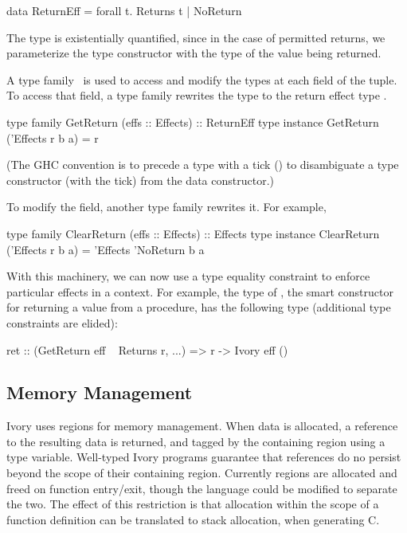 \begin{code}
data ReturnEff = forall t. Returns t | NoReturn
\end{code}

\noindent
The type is existentially quantified, since in the case of permitted returns, we
parameterize the type constructor with the type of the value being returned.

A type family~\cite{} is used to access and modify the types at each field of
the tuple. To access that field, a type family rewrites the  type to
the return effect type .

\begin{code}
type family   GetReturn (effs :: Effects) :: ReturnEff
type instance GetReturn ('Effects r b a) = r
\end{code}

\noindent
(The GHC convention is to precede a type with a tick () to disambiguate a
type constructor (with the tick) from the data constructor.)

To modify the field, another type family rewrites it. For example,

\begin{code}
type family   ClearReturn (effs :: Effects) :: Effects
type instance ClearReturn ('Effects r b a) =
  'Effects 'NoReturn b a
\end{code}

With this machinery, we can now use a type equality constraint to enforce
particular effects in a context. For example, the type of , the smart
constructor for returning a value from a procedure, has the following type
(additional type constraints are elided):

\begin{code}
ret :: (GetReturn eff ~ Returns r, ...)
    => r -> Ivory eff ()
\end{code}

\subsection{Memory Management}
\label{sec:ref}

Ivory uses regions for memory management.  When data is allocated, a reference
to the resulting data is returned, and tagged by the containing region using a
type variable.  Well-typed Ivory programs guarantee that references do no
persist beyond the scope of their containing region.  Currently regions are
allocated and freed on function entry/exit, though the language could be
modified to separate the two.  The effect of this restriction is that allocation
within the scope of a function definition can be translated to stack allocation,
when generating C.

